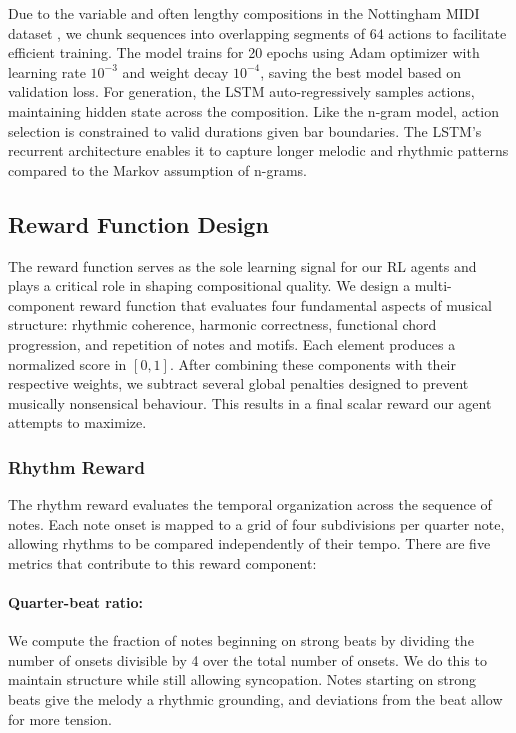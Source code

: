 \documentclass{article}
\begin{document}
Due to the variable and often lengthy compositions in the Nottingham MIDI dataset \citep{nottingham-dataset}, we chunk sequences into overlapping segments of 64 actions to facilitate efficient training. The model trains for 20 epochs using Adam optimizer with learning rate $10^{-3}$ and weight decay $10^{-4}$, saving the best model based on validation loss.
For generation, the LSTM auto-regressively samples actions, maintaining hidden state across the composition. Like the n-gram model, action selection is constrained to valid durations given bar boundaries. The LSTM's recurrent architecture enables it to capture longer melodic and rhythmic patterns compared to the Markov assumption of n-grams.

\subsection{Reward Function Design}

The reward function serves as the sole learning signal for our RL agents and plays a critical role in shaping compositional quality. We design a multi-component reward function that evaluates four fundamental aspects of musical structure: rhythmic coherence, harmonic correctness, functional chord progression, and repetition of notes and motifs. Each element produces a normalized score in $[0,1]$. After combining these components with their respective weights, we subtract several global penalties designed to prevent musically nonsensical behaviour. This results in a final scalar reward our agent attempts to maximize. 

\subsubsection{Rhythm Reward} The rhythm reward evaluates the temporal organization across the sequence of notes. Each note onset is mapped to a grid of four subdivisions per quarter note, allowing rhythms to be compared independently of their tempo. \citep{rhythm-paper} There are five metrics that contribute to this reward component:

\paragraph{Quarter-beat ratio:}
We compute the fraction of notes beginning on strong beats by dividing the number of onsets divisible by 4 over the total number of onsets. We do this to maintain structure while still allowing syncopation. Notes starting on strong beats give the melody a rhythmic grounding, and deviations from the beat allow for more tension.
\end{document}
